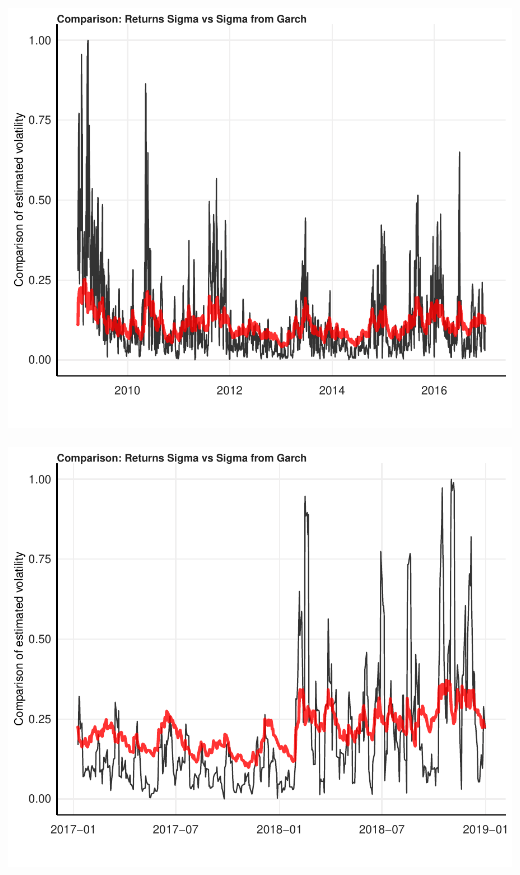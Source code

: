 \documentclass[11pt,preprint, authoryear]{elsarticle}
\let\origfigure\figure
\let\endorigfigure\endfigure
\renewenvironment{figure}[1][2] {
    \expandafter\origfigure\expandafter[H]
} {
    \endorigfigure
}
\numberwithin{equation}{section}
\numberwithin{figure}{section}
\numberwithin{table}{section}
\begin{document}
\begin{figure}[H]

{\centering \includegraphics{Essay_files/figure-latex/plot_1-1} 

}

\caption{EGARCH(1,1) One-Day Ahead Training Forecast}\label{fig:plot_1}
\end{figure}

\begin{figure}[H]

{\centering \includegraphics{Essay_files/figure-latex/plot_2-1} 

}

\caption{EGARCH(1,1) One-Day Ahead Validation Forecast}\label{fig:plot_2}
\end{figure}
\end{document}
